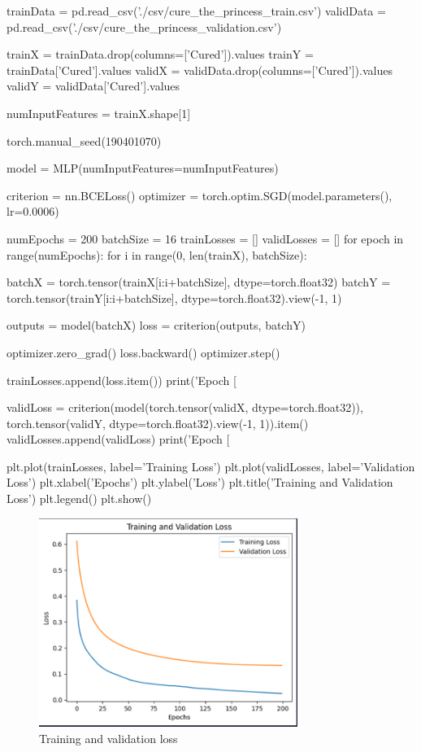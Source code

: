 \documentclass[11pt]{article}
\begin{document}
\begin{python}
trainData = pd.read_csv('./csv/cure_the_princess_train.csv')
validData = pd.read_csv('./csv/cure_the_princess_validation.csv')

trainX = trainData.drop(columns=['Cured']).values
trainY = trainData['Cured'].values
validX = validData.drop(columns=['Cured']).values
validY = validData['Cured'].values

numInputFeatures = trainX.shape[1]

torch.manual_seed(190401070)

model = MLP(numInputFeatures=numInputFeatures)

criterion = nn.BCELoss()
optimizer = torch.optim.SGD(model.parameters(), lr=0.0006)

numEpochs = 200
batchSize = 16
trainLosses = []
validLosses = []
for epoch in range(numEpochs):
    for i in range(0, len(trainX), batchSize):
        
        batchX = torch.tensor(trainX[i:i+batchSize], dtype=torch.float32)
        batchY = torch.tensor(trainY[i:i+batchSize], dtype=torch.float32).view(-1, 1)
          
        outputs = model(batchX)
        loss = criterion(outputs, batchY)
        
        optimizer.zero_grad()
        loss.backward()
        optimizer.step()
        
    trainLosses.append(loss.item())
    print('Epoch [%
    
    validLoss = criterion(model(torch.tensor(validX, dtype=torch.float32)), torch.tensor(validY, dtype=torch.float32).view(-1, 1)).item()
    validLosses.append(validLoss)
    print('Epoch [%
    
plt.plot(trainLosses, label='Training Loss')
plt.plot(validLosses, label='Validation Loss')
plt.xlabel('Epochs')
plt.ylabel('Loss')
plt.title('Training and Validation Loss')
plt.legend()
plt.show()
\end{python}


\begin{figure}[ht!]
    \centering
    \includegraphics[width=0.75\textwidth]{Graph.PNG}
    \caption{Training and validation loss}
    \label{fig:my_pic}
\end{figure}
\end{document}
